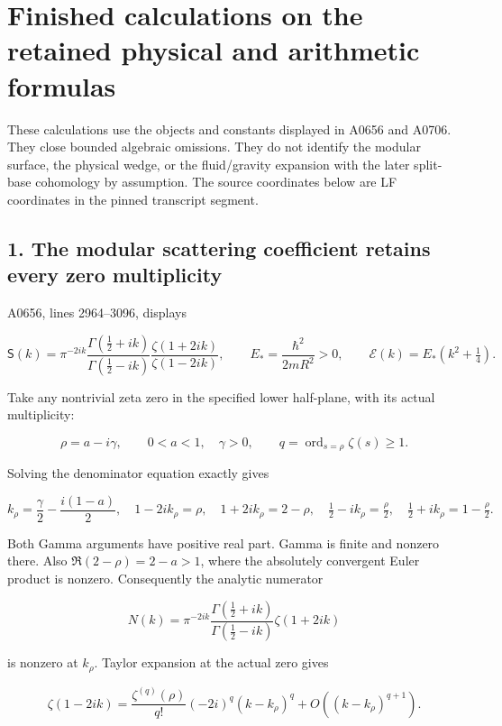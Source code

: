 \section{Finished calculations on the retained physical and arithmetic
formulas}\label{proof10:finished-calculations-on-the-retained-physical-and-arithmetic-formulas}

These calculations use the objects and constants displayed in A0656 and
A0706. They close bounded algebraic omissions. They do not identify the
modular surface, the physical wedge, or the fluid/gravity expansion with
the later split-base cohomology by assumption. The source coordinates
below are LF coordinates in the pinned transcript segment.

\subsection{1. The modular scattering coefficient retains every zero
multiplicity}\label{proof10:the-modular-scattering-coefficient-retains-every-zero-multiplicity}

A0656, lines 2964--3096, displays

\[
\mathsf S(k)=\pi^{-2ik}
\frac{\Gamma(\frac12+ik)}{\Gamma(\frac12-ik)}
\frac{\zeta(1+2ik)}{\zeta(1-2ik)},
\qquad E_* = \frac{\hbar^2}{2mR^2}>0,
\qquad \mathcal E(k)=E_*(k^2+\tfrac14).
\]

Take any nontrivial zeta zero in the specified lower half-plane, with
its actual multiplicity:

\[
\rho=a-i\gamma,\qquad 0<a<1,\quad\gamma>0,
\qquad q=\operatorname{ord}_{s=\rho}\zeta(s)\ge1.
\]

Solving the denominator equation exactly gives

\[
k_\rho=\frac\gamma2-\frac{i(1-a)}2,
\quad 1-2ik_\rho=\rho,
\quad 1+2ik_\rho=2-\rho,
\quad \tfrac12-ik_\rho=\tfrac\rho2,
\quad \tfrac12+ik_\rho=1-\tfrac\rho2.
\]

Both Gamma arguments have positive real part. Gamma is finite and
nonzero there. Also \(\Re(2-\rho)=2-a>1\), where the absolutely
convergent Euler product is nonzero. Consequently the analytic numerator

\[
N(k)=\pi^{-2ik}
\frac{\Gamma(\frac12+ik)}{\Gamma(\frac12-ik)}\zeta(1+2ik)
\]

is nonzero at \(k_\rho\). Taylor expansion at the actual zero gives

\[
\zeta(1-2ik)
=\frac{\zeta^{(q)}(\rho)}{q!}(-2i)^q(k-k_\rho)^q
+O((k-k_\rho)^{q+1}).
\]

